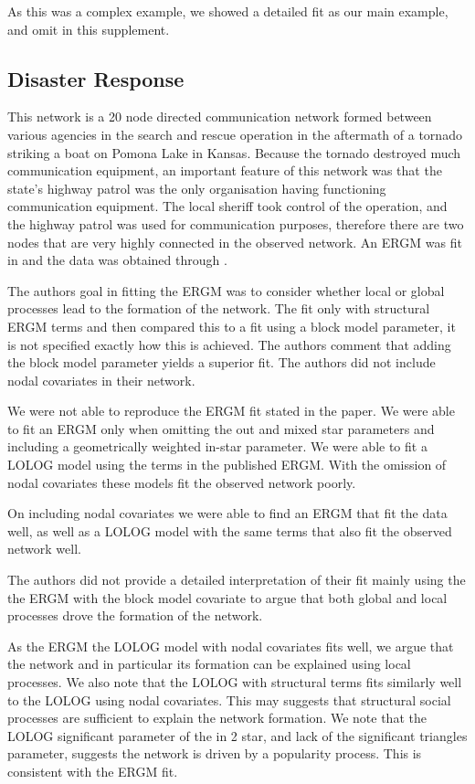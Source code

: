 \documentclass[
]{statsoc}
\begin{document}
As this was a complex example, we showed a detailed fit as our main
example, and omit in this supplement.

\subsection{Disaster Response}

This network is a 20 node directed communication network formed between
various agencies in the search and rescue operation in the aftermath of
a tornado striking a boat on Pomona Lake in Kansas. Because the tornado
destroyed much communication equipment, an important feature of this
network was that the state's highway patrol was the only organisation
having functioning communication equipment. The local sheriff took
control of the operation, and the highway patrol was used for
communication purposes, therefore there are two nodes that are very
highly connected in the observed network. An ERGM was fit in
\cite{Doreian2012} and the data was obtained through
\cite{DisasterData}.

The authors goal in fitting the ERGM was to consider whether local or
global processes lead to the formation of the network. The fit only with
structural ERGM terms and then compared this to a fit using a block
model parameter, it is not specified exactly how this is achieved. The
authors comment that adding the block model parameter yields a superior
fit. The authors did not include nodal covariates in their network.

We were not able to reproduce the ERGM fit stated in the paper. We were
able to fit an ERGM only when omitting the out and mixed star parameters
and including a geometrically weighted in-star parameter. We were able
to fit a LOLOG model using the terms in the published ERGM. With the
omission of nodal covariates these models fit the observed network
poorly.

On including nodal covariates we were able to find an ERGM that fit the
data well, as well as a LOLOG model with the same terms that also fit
the observed network well.

The authors did not provide a detailed interpretation of their fit
mainly using the the ERGM with the block model covariate to argue that
both global and local processes drove the formation of the network.

As the ERGM the LOLOG model with nodal covariates fits well, we argue
that the network and in particular its formation can be explained using
local processes. We also note that the LOLOG with structural terms fits
similarly well to the LOLOG using nodal covariates. This may suggests
that structural social processes are sufficient to explain the network
formation. We note that the LOLOG significant parameter of the in 2
star, and lack of the significant triangles parameter, suggests the
network is driven by a popularity process. This is consistent with the
ERGM fit.
\end{document}
